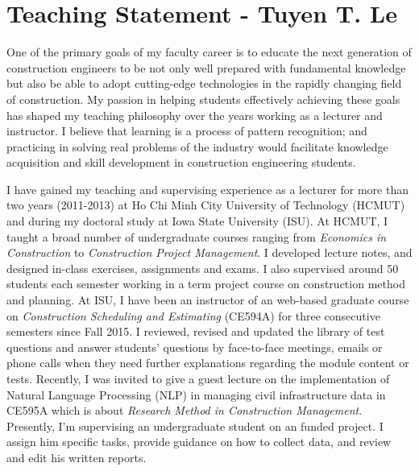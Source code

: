 \documentclass[a4paper,11pt]{article}
\begin{document}
\singlespacing
{}
\sectionfont{\centering}

\section*{\large Teaching Statement - Tuyen T. Le}

%
One of the primary goals of my faculty career is to educate the next generation of construction engineers to be not only well prepared with fundamental knowledge but also be able to adopt cutting-edge technologies in the rapidly changing field of construction. 
%
My passion in helping students effectively achieving these goals has shaped my teaching philosophy over the years working as a lecturer and instructor.
%
I believe that learning is a process of pattern recognition; and practicing in solving real problems of the industry would facilitate knowledge acquisition and skill development in construction engineering students. 
%
%
\par
I have gained my teaching and supervising experience as a lecturer for more than two years (2011-2013) at Ho Chi Minh City University of Technology (HCMUT) and during my doctoral study at Iowa State University (ISU). 
%
At HCMUT, I taught a broad number of undergraduate courses ranging from {\sl Economics in Construction} to {\sl Construction Project Management}. I developed lecture notes, and designed in-class exercises, assignments and exams. I also supervised around 50 students each semester working in a term project course on construction method and planning. 
%
At ISU, I have been an instructor of an web-based graduate course on {\sl Construction Scheduling and Estimating} (CE594A) for three consecutive semesters since Fall 2015. I reviewed, revised and updated the library of test questions and answer students' questions by face-to-face meetings, emails or phone calls when they need further explanations regarding the module content or tests. Recently, I was invited to give a guest lecture on the implementation of  Natural Language Processing (NLP) in managing civil infrastructure data in CE595A which is about {\sl Research Method in Construction Management}. Presently, I'm supervising an undergraduate student on an funded project. I assign him specific tasks, provide guidance on how to collect data, and review and edit his written reports. 
\end{document}

